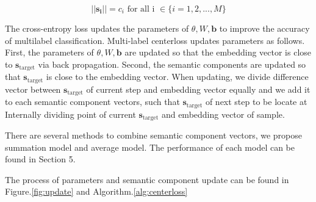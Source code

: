 \[
||\mathbf{s_i}|| = c_i \text{ for all i }\in \{i = 1,2, ..., M\}
\]

The cross-entropy loss updates the parameters of $ \theta, W, \mathbf{b} $ to improve the accuracy of multilabel classification. Multi-label centerloss updates parameters as follows. First, the parameters of $\theta, W, \mathbf{b} $ are updated so that the embedding vector is close to $\mathbf{s}_{\text{target}} $ via back propagation. Second, the semantic components are updated so that $ \mathbf{s}_{\text{target}} $ is close to the embedding vector. When updating, we divide difference vector between $\mathbf{s}_{\text{target}}$ of current step and embedding vector equally and we add it to each semantic component vectors, such that $\mathbf{s}_{\text{target}}$ of next step to be locate at Internally dividing point of current $\mathbf{s}_{\text{target}}$ and embedding vector of sample. 

There are several methods to combine semantic component vectors, we propose summation model and average model. The performance of each model can be found in Section 5.

The process of parameters and semantic component update can be found in Figure.\ref{fig:update} and Algorithm.\ref{alg:centerloss}


